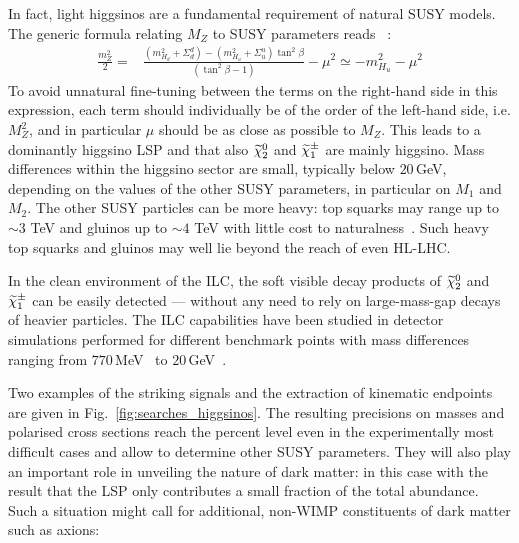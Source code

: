 In fact, 
light higgsinos are a fundamental requirement 
of natural SUSY models.
The generic formula relating $M_Z$ to SUSY parameters reads
~\cite{Bae:2014yta}:
\begin{align}
\frac{m_Z^2}{2} =& \frac{(m_{H_d}^2+\Sigma_d^d)-(m_{H_u}^2+\Sigma_u^u)\tan^2\beta}{(\tan^2\beta -1)}
-\mu^2\simeq -m_{H_u}^2-\mu^2
\label{eq:searches_mzs}
\end{align}
To avoid unnatural fine-tuning between the terms on the right-hand side in
this expression, each term should individually be of the order of the left-hand side,
i.e.  $M^2_Z$,
and in particular $\mu$ should be as close as possible to $M_Z$.
This leads to a dominantly higgsino LSP and that
also $\mbox{$ \widetilde{\chi}^0_2 $}$ and $\mbox{$ \widetilde{\chi}^{\pm}_1 $}$ are mainly higgsino.
Mass differences within the higgsino sector are small, 
typically  below $20$\,GeV,
depending on the values of the other SUSY parameters, 
in particular on $M_1$ and $M_2$.
The other SUSY particles can be more heavy:
top squarks may range up to $\sim 3$ TeV and gluinos 
up to $\sim 4$ TeV with little cost to naturalness~\cite{Bae:2014yta}. 
Such heavy top squarks and gluinos may well lie beyond the reach of even HL-LHC.

In the clean environment of the ILC, the soft visible
decay products of $\mbox{$ \widetilde{\chi}^0_2 $}$ and $\mbox{$ \widetilde{\chi}^{\pm}_1 $}$ can be easily detected 
--- without any need to rely on large-mass-gap decays
of heavier particles. 
The ILC capabilities 
have been studied in detector simulations performed for different 
benchmark points with mass 
differences ranging from $770$\,MeV~\cite{Berggren:2013vfa}
to $20$\,GeV~\cite{Baer:2016new}. 

Two examples of the striking signals and the extraction of 
kinematic endpoints are given in Fig.~\ref{fig:searches_higgsinos}. 
The resulting precisions on masses and polarised 
cross sections reach the percent level even in the experimentally most difficult 
cases and allow to determine other SUSY parameters.
They will also play an important role in unveiling the nature of dark matter: 
in this case with the result that the LSP only contributes a small fraction of the 
total abundance. Such a situation might call for additional, non-WIMP constituents of 
dark matter such as axions:


